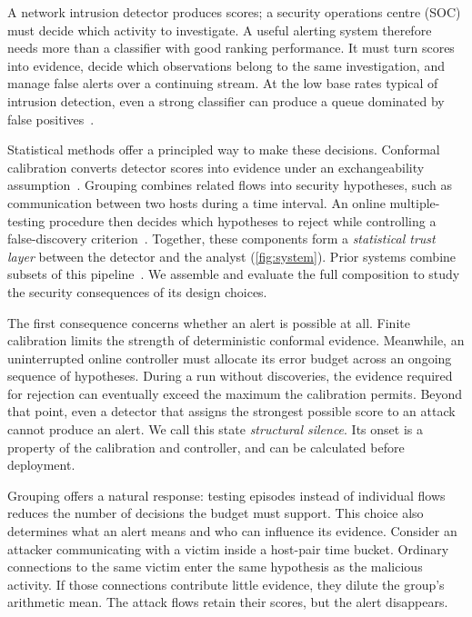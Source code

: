 \documentclass[conference]{IEEEtran}
\begin{document}
A network intrusion detector produces scores; a security operations centre (SOC) must decide which
activity to investigate. A useful alerting system therefore needs more than a classifier with good
ranking performance. It must turn scores into evidence, decide which observations belong to the same
investigation, and manage false alerts over a continuing stream. At the low base rates typical of
intrusion detection, even a strong classifier can produce a queue dominated by false
positives~\cite{axelsson1999baserate,axelsson2000baserate}.

Statistical methods offer a principled way to make these decisions. Conformal calibration converts
detector scores into evidence under an exchangeability assumption~\cite{vovk2005alrw,bates2023outliers}.
Grouping combines related flows into security hypotheses, such as communication between two hosts
during a time interval. An online multiple-testing procedure then decides which hypotheses to reject
while controlling a false-discovery criterion~\cite{javanmard2015lond,ramdas2017lordpp,xu2024elond}.
Together, these components form a \emph{statistical trust layer} between the detector and the analyst
(\cref{fig:system}). Prior systems combine subsets of this
pipeline~\cite{rebjock2021online,farzaneh2025coad,wang2025multilayer,gao2026boundary}.
We assemble and evaluate the full composition to study the security consequences of its design choices.

The first consequence concerns whether an alert is possible at all. Finite calibration limits the
strength of deterministic conformal evidence. Meanwhile, an uninterrupted online controller must
allocate its error budget across an ongoing sequence of hypotheses. During a run without discoveries,
the evidence required for rejection can eventually exceed the maximum the calibration permits.
Beyond that point, even a detector that assigns the strongest possible score to an attack cannot
produce an alert. We call this state \emph{structural silence}. Its onset is a property of the
calibration and controller, and can be calculated before deployment.

Grouping offers a natural response: testing episodes instead of individual flows reduces the number
of decisions the budget must support. This choice also determines what an alert means and who can
influence its evidence. Consider an attacker communicating with a victim inside a host-pair time
bucket. Ordinary connections to the same victim enter the same hypothesis as the malicious activity.
If those connections contribute little evidence, they dilute the group's arithmetic mean. The attack
flows retain their scores, but the alert disappears.
\end{document}
